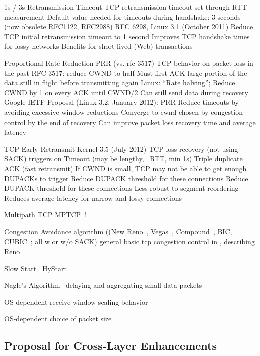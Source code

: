 1s / 3s Retransmission Timeout \cite{rfc6298}
 TCP retransmission timeout set through RTT measurement
 Default value needed for timeouts during handshake: 3 seconds (now obsolete RFC1122, RFC2988)
 RFC 6298, Linux 3.1 (October 2011)
	Reduce TCP initial retransmission timeout to 1 second
 Improves TCP handshake times for lossy networks
 Benefits for short-lived (Web) transactions


Proportional Rate Reduction PRR (vs. rfc 3517)
 TCP behavior on packet loss in the past
	RFC 3517: reduce CWND to half
		Must first ACK large portion of the data still in flight before transmitting again
	Linux: ``Rate halving''; Reduce CWND by 1 on every ACK until CWND/2
		Can still send data during recovery
 Google IETF Proposal (Linux 3.2, January 2012): PRR
	Reduce timeouts by avoiding excessive window reductions
	Converge to cwnd chosen by congestion control by the end of recovery
	Can improve packet loss recovery time and average latency



TCP Early Retransmit \cite{rfc5827} Kernel 3.5 (July 2012)
 TCP loss recovery (not using SACK) triggers on
	Timeout (may be lengthy, ~RTT, min 1s)
	Triple duplicate ACK (fast retransmit)
		If CWND is small, TCP may not be able to get enough DUPACKs to trigger
		Reduce DUPACK threshold for these connections
 Reduce DUPACK threshold for these connections
	Less robust to segment reordering
 Reduces average latency for narrow and lossy connections

Multipath TCP MPTCP~\cite{rfc6824}!


Congestion Avoidance algorithm ((New Reno~\cite{rfc6582}, Vegas~\cite{Brakmo:1994:TVN:190809.190317}, Compound~\cite{song2006compound}, BIC, CUBIC~\cite{ha2008cubic}; all w or w/o SACK)
general basic tcp congestion control in \cite{rfc5681}, describing Reno

Slow Start~\cite{rfc5681}
 HyStart~\cite{Ha20112092}


Nagle's Algorithm~\cite{rfc896} delaying and aggregating small data packets


OS-dependent receive window scaling behavior

OS-dependent choice of packet size


\subsection{Proposal for Cross-Layer Enhancements}
\label{c5:crosslayerhinting}


